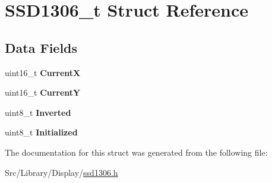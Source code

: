 \hypertarget{struct_s_s_d1306__t}{}\section{S\+S\+D1306\+\_\+t Struct Reference}
\label{struct_s_s_d1306__t}
\subsection*{Data Fields}
\begin{DoxyCompactItemize}
\item 
\mbox{\label{struct_s_s_d1306__t_a2c40063b7f8a6faf0cb91f191070e87a}} 
uint16\+\_\+t {\bfseries CurrentX}
\item 
\mbox{\label{struct_s_s_d1306__t_a231012af7d06a1e4395368f8b688e7d3}} 
uint16\+\_\+t {\bfseries CurrentY}
\item 
\mbox{\label{struct_s_s_d1306__t_a1332809f31ef3c465321a19262e75d71}} 
uint8\+\_\+t {\bfseries Inverted}
\item 
\mbox{\label{struct_s_s_d1306__t_a5ced8054f4e1bd14884d253d81449cf2}} 
uint8\+\_\+t {\bfseries Initialized}
\end{DoxyCompactItemize}


The documentation for this struct was generated from the following file\+:\begin{DoxyCompactItemize}
\item 
Src/\+Library/\+Display/\hyperlink{ssd1306_8h}{ssd1306.\+h}\end{DoxyCompactItemize}
